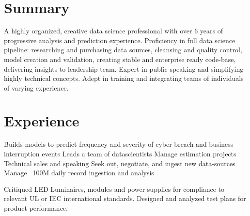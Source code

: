 \documentclass[letterpaper]{deedy-resume} %
\begin{document}
\begin{minipage}[t]{0.66\textwidth} %



\section{Summary}

A highly organized, creative data science professional with over 6 years of progressive analysis and prediction experience.  Proficiency in full data science pipeline: researching and purchasing data sources, cleansing and quality control, model creation and validation, creating stable and enterprise ready code-base, delivering insights to leadership team.  Expert in public speaking and simplifying highly technical concepts.  Adept in training and integrating teams of individuals of varying experience.  



\section{Experience}

\sectionspace %
\vspace{\topsep}
\begin{tightitemize}
\item Builds models to predict frequency and severity of cyber breach and business interruption events \textbullet{}  Leads a team of datascientists \textbullet{} Manage estimation projects \textbullet{} Technical sales and speaking \textbullet{} Seek out, negotiate, and ingest new data-sources \textbullet{} Manage ~100M daily record ingestion and analysis
\end{tightitemize}

\sectionspace %
\vspace{\topsep} %
\begin{tightitemize}
\item Critiqued LED Luminaires, modules and power supplies for compliance to relevant UL or IEC international standards. Designed and analyzed test plans for product performance.
\end{tightitemize}



\end{minipage}
\end{document}
